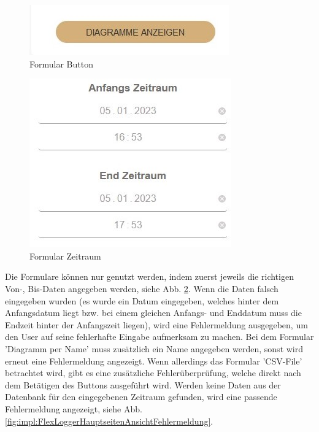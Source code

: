 \begin{figure}
\centering
\includegraphics[scale=1]{pics/FlexLoggerWebsiteFormulare_button.jpg}
\caption{Formular Button}
\label{fig:impl:FlexLoggerHauptseitenAnsichtButton}
\end{figure}


\begin{figure}
\centering
\includegraphics[scale=1]{pics/FlexLoggerWebsiteFormulare_zeitraum.jpg}
\caption{Formular Zeitraum}
\label{fig:impl:FlexLoggerHauptseitenAnsichtZeitraum}
\end{figure}


Die Formulare können nur genutzt werden, indem zuerst jeweils die richtigen Von-, Bis-Daten angegeben werden, siehe Abb. \ref{fig:impl:FlexLoggerHauptseitenAnsichtZeitraum}. Wenn die Daten falsch eingegeben wurden (es wurde ein Datum eingegeben, welches hinter dem Anfangsdatum liegt bzw. bei einem gleichen Anfangs- und Enddatum muss die Endzeit hinter der Anfangszeit liegen), wird eine Fehlermeldung ausgegeben, um den User auf seine fehlerhafte Eingabe aufmerksam zu machen. Bei dem Formular 'Diagramm per Name' muss zusätzlich ein Name angegeben werden, sonst wird erneut eine Fehlermeldung angezeigt. Wenn allerdings das Formular 'CSV-File' betrachtet wird, gibt es eine zusätzliche Fehlerüberprüfung, welche direkt nach dem Betätigen des Buttons ausgeführt wird. Werden keine Daten aus der Datenbank für den eingegebenen Zeitraum gefunden, wird eine passende Fehlermeldung angezeigt, siehe Abb. \ref{fig:impl:FlexLoggerHauptseitenAnsichtFehlermeldung}.



